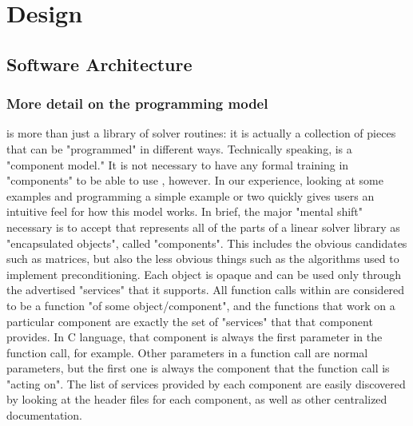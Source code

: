 \chapter{Design}
\label{Design}

\section{Software Architecture}
\label{Software Architecture}

\subsection{More detail on the programming model}


\hypre{} is more than just a
library of solver routines: it 
is actually a collection of pieces that can be "programmed" in different ways.
Technically speaking, 
\hypre{} is a "component model." It is not necessary to have any formal training
in "components" to be able 
to use \hypre{}, however. In our experience, looking at some examples and
programming a simple example 
or two quickly gives users an intuitive feel for how this model works. In
brief, the major "mental shift" 
necessary is to accept that \hypre{} represents all of the parts of a linear
solver library as "encapsulated 
objects", called "components". This includes the obvious candidates such as
matrices, but also the less 
obvious things such as the algorithms used to implement preconditioning. Each
object is opaque and can be 
used only through the advertised "services" that it supports. All function
calls within \hypre{} are 
considered to be a function "of some object/component", and the functions that
work on a particular 
component are exactly the set of "services" that that component provides. In C
language, that component is 
always the first parameter in the function call, for example. Other parameters
in a function call are normal 
parameters, but the first one is always the component that the function call is
"acting on". The list of 
services provided by each component are easily discovered by looking at the
header files for each 
component, as well as other centralized documentation. 

